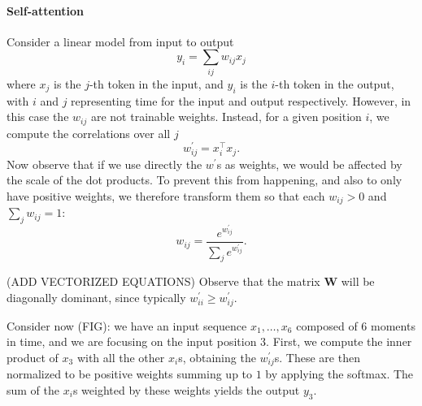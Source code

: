 \paragraph{Self-attention}
Consider a linear model from input to output 
\begin{equation}
    y_i = \sum_{ij} w_{ij} x_j
\end{equation}
where $x_j$ is the $j$-th token in the input, and $y_i$ is the $i$-th token in the output, with $i$ and $j$ representing time for the input and output respectively.
However, in this case the $w_{ij}$ are not trainable weights. Instead, for a given position $i$, we compute the correlations over all $j$
\begin{equation}
    w^{\prime}_{ij} = x_i ^\top x_j.
\end{equation}
Now observe that if we use directly the $w^{\prime}$s as weights, we would be affected by the scale of the dot products. 
To prevent this from happening, and also to only have positive weights, we therefore transform them so that each $w_{ij} > 0 $ and $\sum_j w_{ij} = 1$:
\begin{equation}
    w_{ij} = \frac{e^{w_{ij}^\prime}}{\sum_j e^{w_{ij}^\prime}}.
\end{equation} 

(ADD VECTORIZED EQUATIONS)
Observe that the matrix $\mathbf{W}$ will be diagonally dominant, since typically $w_{ii}^\prime \geq w_{ij}^\prime$. 

Consider now (FIG): we have an input sequence $x_1, \dots, x_6$ composed of $6$ moments in time, and we are focusing on the input position $3$. First, we compute the inner product of $x_3$ with all the other $x_i$s, obtaining the $w^\prime_{ij}$s. These are then normalized to be positive weights summing up to $1$ by applying the softmax. The sum of the $x_i$s weighted by these weights yields the output $y_3$.

